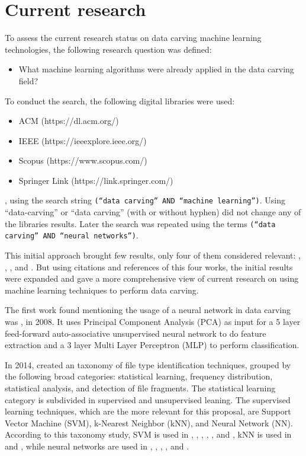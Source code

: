 \section{Current research}
To assess the current research status on data carving machine learning technologies, the following research question was defined:

\begin{itemize}
    \item What machine learning algorithms were already applied in the data carving field?
\end{itemize}

To conduct the search, the following digital libraries were used: 
\begin{itemize}
\item{ACM} (https://dl.acm.org/)
\item IEEE (https://ieeexplore.ieee.org/)
\item Scopus (https://www.scopus.com/) 
\item Springer Link (https://link.springer.com/)
\end{itemize}


, using the search string 
{\texttt{(``data carving'' AND ``machine learning'')}}. Using ``data-carving'' or ``data carving'' (with or without hyphen) did not change any of the libraries results. Later the search was repeated using the terms {\texttt{(``data carving'' AND ``neural networks'')}}.

This initial approach brought few results, only four of them considered relevant: \cite{alamri_taxonomy_2014}, 
\cite{ali_review_2018}, \cite{sportiello_context-based_2012}, and \cite{beebe_sceadan:_2013}. But using citations and references of this four works, the initial results were expanded and gave a more comprehensive view of current research on using machine learning techniques to perform data carving.

The first work found mentioning the usage of a neural network in data carving was \cite{amirani_new_2008}, in 2008. It uses Principal Component Analysis (PCA) as input for a 5 layer feed-forward auto-associative unsupervised neural network to do feature extraction and a 3 layer Multi Layer Perceptron (MLP) to perform classification.

In 2014, \cite{alamri_taxonomy_2014} created an taxonomy of file type identification techniques, grouped by the following broad categories: statistical learning, frequency distribution, statistical analysis, and detection of file fragments. The statistical learning category is subdivided in supervised and unsupervised leaning. The supervised learning techniques, which are the more relevant for this proposal, are Support Vector Machine (SVM), k-Nearest Neighbor (kNN), and Neural Network (NN). According to this taxonomy study, SVM is used in \cite{ahmed_fast_2011}, \cite{amirani_feature-based_2013}, \cite{beebe_sceadan:_2013}, \cite{fitzgerald_using_2012}, \cite{gopal_statistical_2011}, and \cite{sportiello_context-based_2012}, kNN is used in \cite{ahmed_fast_2011} and \cite{gopal_statistical_2011}, while neural networks are used in \cite{ahmed_fast_2011}, \cite{ahmed_content-based_2010}, \cite{amirani_new_2008}, \cite{amirani_feature-based_2013}, and \cite{penrose_approaches_2013}.

